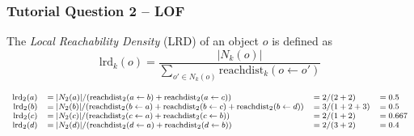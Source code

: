 \documentclass[aspectratio=169, 10pt]{beamer}
\begin{document}
\begin{frame}[t]
    \frametitle{Tutorial Question 2 -- LOF}
    
    The {\em Local Reachability Density} (LRD) of an object $o$ is defined as
    \[
        \text{lrd}_k(o) = \frac{|N_k(o)|}{\sum_{o' \in N_k(o)} \text{reachdist}_k(o \leftarrow o')}
        \]
        
    \begin{equation*}
        \footnotesize
        \begin{array}{rlll}
            \text{lrd}_2(a) & = |N_2(a)| / (\text{reachdist}_2(a \leftarrow b) + \text{reachdist}_2(a \leftarrow c))                                      & = 2 / (2 + 2) & = 0.5\\
            \text{lrd}_2(b) & = |N_2(b)| / (\text{reachdist}_2(b \leftarrow a) + \text{reachdist}_2(b \leftarrow c) + \text{reachdist}_2(b \leftarrow d)) & = 3 / (1+2+3) & = 0.5\\
            \text{lrd}_2(c) & = |N_2(c)| / (\text{reachdist}_2(c \leftarrow a) + \text{reachdist}_2(c \leftarrow b))                                      & = 2 / (1 + 2) & = 0.667\\
            \text{lrd}_2(d) & = |N_2(d)| / (\text{reachdist}_2(d \leftarrow a) + \text{reachdist}_2(d \leftarrow b))                                      & = 2 / (3 + 2) & = 0.4\\
        \end{array}
    \end{equation*}

\end{frame}
\end{document}
